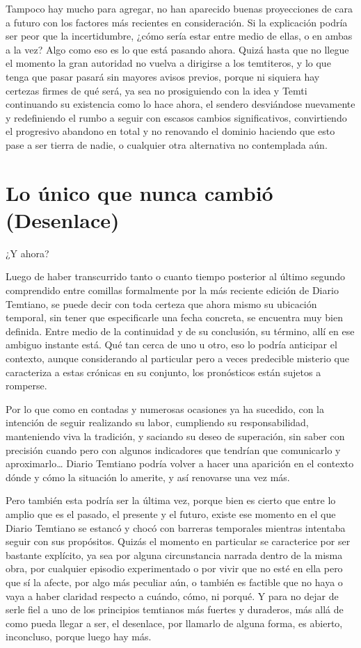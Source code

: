 \documentclass[
  spanish,
]{book}
\begin{document}
Tampoco hay mucho para agregar, no han aparecido buenas proyecciones de cara a futuro con los factores más recientes en consideración. Si la explicación podría ser peor que la incertidumbre, ¿cómo sería estar entre medio de ellas, o en ambas a la vez? Algo como eso es lo que está pasando ahora. Quizá hasta que no llegue el momento la gran autoridad no vuelva a dirigirse a los temtiteros, y lo que tenga que pasar pasará sin mayores avisos previos, porque ni siquiera hay certezas firmes de qué será, ya sea no prosiguiendo con la idea y Temti continuando su existencia como lo hace ahora, el sendero desviándose nuevamente y redefiniendo el rumbo a seguir con escasos cambios significativos, convirtiendo el progresivo abandono en total y no renovando el dominio haciendo que esto pase a ser tierra de nadie, o cualquier otra alternativa no contemplada aún.

\hypertarget{lo-uxfanico-que-nunca-cambiuxf3-desenlace}{%
\chapter{Lo único que nunca cambió (Desenlace)}\label{lo-uxfanico-que-nunca-cambiuxf3-desenlace}}

¿Y ahora?

Luego de haber transcurrido tanto o cuanto tiempo posterior al último segundo comprendido entre comillas formalmente por la más reciente edición de Diario Temtiano, se puede decir con toda certeza que ahora mismo su ubicación temporal, sin tener que especificarle una fecha concreta, se encuentra muy bien definida. Entre medio de la continuidad y de su conclusión, su término, allí en ese ambiguo instante está. Qué tan cerca de uno u otro, eso lo podría anticipar el contexto, aunque considerando al particular pero a veces predecible misterio que caracteriza a estas crónicas en su conjunto, los pronósticos están sujetos a romperse.

Por lo que como en contadas y numerosas ocasiones ya ha sucedido, con la intención de seguir realizando su labor, cumpliendo su responsabilidad, manteniendo viva la tradición, y saciando su deseo de superación, sin saber con precisión cuando pero con algunos indicadores que tendrían que comunicarlo y aproximarlo\ldots{} Diario Temtiano podría volver a hacer una aparición en el contexto dónde y cómo la situación lo amerite, y así renovarse una vez más.

Pero también esta podría ser la última vez, porque bien es cierto que entre lo amplio que es el pasado, el presente y el futuro, existe ese momento en el que Diario Temtiano se estancó y chocó con barreras temporales mientras intentaba seguir con sus propósitos. Quizás el momento en particular se caracterice por ser bastante explícito, ya sea por alguna circunstancia narrada dentro de la misma obra, por cualquier episodio experimentado o por vivir que no esté en ella pero que sí la afecte, por algo más peculiar aún, o también es factible que no haya o vaya a haber claridad respecto a cuándo, cómo, ni porqué. Y para no dejar de serle fiel a uno de los principios temtianos más fuertes y duraderos, más allá de como pueda llegar a ser, el desenlace, por llamarlo de alguna forma, es abierto, inconcluso, porque luego hay más.
\end{document}
